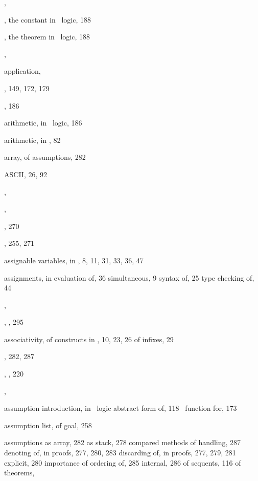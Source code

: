 \begin{theindex}
  \item {}, 
  \item {}, the constant in \HOL\ logic, 188
  \item {}, the theorem in \HOL\ logic, 188
  \item {}, 
  \item application, 
  \item {}, 149, 172, 179
  \item {}, 186
  \item arithmetic, in \HOL\ logic, 186
  \item arithmetic, in \ML, 82
  \item array, of assumptions, 282
  \item {\small ASCII}, 26, 92
  \item {}, 
  \item {}, 
  \item {}, 270
  \item {}, 255, 271
  \item assignable variables, in \ML, 8, 11, 31, 33, 36, 47
  \item assignments, in \ML
    \subitem evaluation of, 36
    \subitem simultaneous, 9
    \subitem syntax of, 25
    \subitem type checking of, 44
  \item {}, 
  \item {}, , 295
  \item associativity, of constructs in \ML, 10, 23, 26
    \subitem of infixes, 29
  \item {}, 282, 287
  \item {}, , 220
  \item {}, 
  \item assumption introduction, in \HOL\ logic
    \subitem abstract form of, 118
    \subitem \ML\ function for, 173
  \item assumption list, of goal, 258
  \item assumptions
    \subitem as array, 282
    \subitem as stack, 278
    \subitem compared methods of handling, 287
    \subitem denoting of, in proofs, 277, 280, 283
    \subitem discarding of, in proofs, 277, 279, 281
    \subitem explicit, 280
    \subitem importance of ordering of, 285
    \subitem internal, 286
    \subitem of sequents, 116
    \subitem of theorems, 

\end{theindex}
